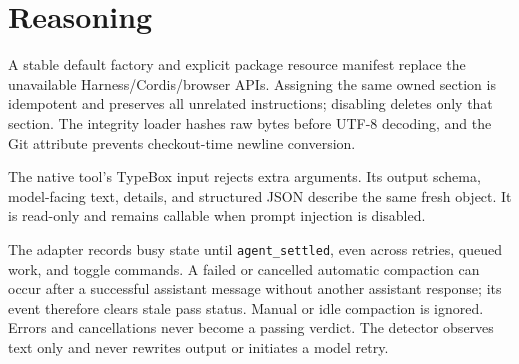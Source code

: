 \documentclass[10pt]{ltjsarticle}
\begin{document}
\section{Reasoning}
A stable default factory and explicit package resource manifest replace the
unavailable Harness/Cordis/browser APIs. Assigning the same owned section is
idempotent and preserves all unrelated instructions; disabling deletes only
that section. The integrity loader hashes raw bytes before UTF-8 decoding,
and the Git attribute prevents checkout-time newline conversion.

The native tool's TypeBox input rejects extra arguments. Its output schema,
model-facing text, details, and structured JSON describe the same fresh object.
It is read-only and remains callable when prompt injection is disabled.

The adapter records busy state until \texttt{agent\_settled}, even across
retries, queued work, and toggle commands. A failed or cancelled automatic
compaction can occur after a successful assistant message without another
assistant response; its event therefore clears stale pass status. Manual or
idle compaction is ignored. Errors and cancellations never become a passing
verdict. The detector observes text only and never rewrites output or
initiates a model retry.
\end{document}

